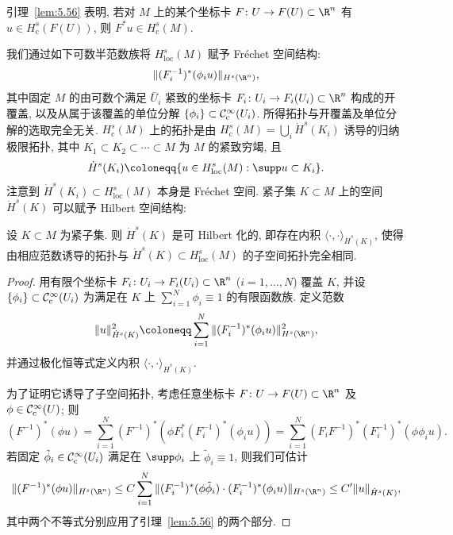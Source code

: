引理~\ref{lem:5.56} 表明, 若对 $M$ 上的某个坐标卡 $F \colon U \to F(U) \subset \R^n$ 有 $u \in H_{\mathrm{c}}^s(F(U))$, 则 $F^* u \in H_{\mathrm{c}}^s(M)$.

我们通过如下可数半范数族将 $H_{\mathrm{loc}}^s(M)$ 赋予 Fréchet 空间结构:
\begin{equation}\label{eq:5.135}
    \|(F_i^{-1})^* (\phi_i u)\|_{H^s(\R^n)},
\end{equation}
其中固定 $M$ 的由可数个满足 $\bar{U}_i$ 紧致的坐标卡 $F_i \colon U_i \to F_i(U_i) \subset \R^n$ 构成的开覆盖, 以及从属于该覆盖的单位分解 $\{\phi_i\} \subset \mathcal{C}_{\mathrm{c}}^\infty(U_i)$. 所得拓扑与开覆盖及单位分解的选取完全无关. $H_{\mathrm{c}}^s(M)$ 上的拓扑是由 $H_{\mathrm{c}}^s(M) = \bigcup_i \dot{H}^s(K_i)$ 诱导的归纳极限拓扑, 其中 $K_1 \subset K_2 \subset \cdots \subset M$ 为 $M$ 的紧致穷竭, 且
\begin{equation}\label{eq:5.136}
    \dot{H}^s(K_i) \defeq \{u \in H_{\mathrm{loc}}^s(M) : \supp u \subset K_i\}.
\end{equation}
注意到 $\dot{H}^s(K_i) \subset H_{\mathrm{loc}}^s(M)$ 本身是 Fréchet 空间. 紧子集 $K \subset M$ 上的空间 $\dot{H}^s(K)$ 可以赋予 Hilbert 空间结构:

\begin{proposition}\label{prop:5.58}
设 $K \subset M$ 为紧子集. 则 $\dot{H}^s(K)$ 是可 Hilbert 化的, 即存在内积 $\langle \cdot, \cdot \rangle_{\dot{H}^s(K)}$, 使得由相应范数诱导的拓扑与 $\dot{H}^s(K) \subset H_{\mathrm{loc}}^s(M)$ 的子空间拓扑完全相同.
\end{proposition}

\begin{proof}
用有限个坐标卡 $F_i \colon U_i \to F_i(U_i) \subset \R^n$ ($i = 1, \ldots, N$) 覆盖 $K$, 并设 $\{\phi_i\} \subset \mathcal{C}_{\mathrm{c}}^\infty(U_i)$ 为满足在 $K$ 上 $\sum_{i=1}^N \phi_i \equiv 1$ 的有限函数族. 定义范数
\begin{equation}\label{eq:5.137}
    \|u\|_{\dot{H}^s(K)}^2 \defeq \sum_{i=1}^N \|(F_i^{-1})^* (\phi_i u)\|_{H^s(\R^n)}^2,
\end{equation}
并通过极化恒等式定义内积 $\langle \cdot, \cdot \rangle_{\dot{H}^s(K)}$.

为了证明它诱导了子空间拓扑, 考虑任意坐标卡 $F \colon U \to F(U) \subset \R^n$ 及 $\phi \in \mathcal{C}_{\mathrm{c}}^\infty(U)$; 则
\begin{equation}\label{eq:5.138}
    (F^{-1})^* (\phi u) = \sum_{i=1}^N (F^{-1})^* \left( \phi F_i^* (F_i^{-1})^*(\phi_i u) \right) = \sum_{i=1}^N (F_i F^{-1})^* (F_i^{-1})^*(\phi \phi_i u).
\end{equation}
若固定 $\tilde{\phi}_i \in \mathcal{C}_{\mathrm{c}}^\infty(U_i)$ 满足在 $\supp\phi_i$ 上 $\tilde{\phi}_i \equiv 1$, 则我们可估计
\begin{equation}\label{eq:5.139}
    \|(F^{-1})^*(\phi u)\|_{H^s(\R^n)} \le C \sum_{i=1}^N \|(F_i^{-1})^*(\phi \tilde{\phi}_i) \cdot (F_i^{-1})^*(\phi_i u)\|_{H^s(\R^n)} \le C' \|u\|_{\dot{H}^s(K)},
\end{equation}
其中两个不等式分别应用了引理~\ref{lem:5.56} 的两个部分.
\end{proof}


